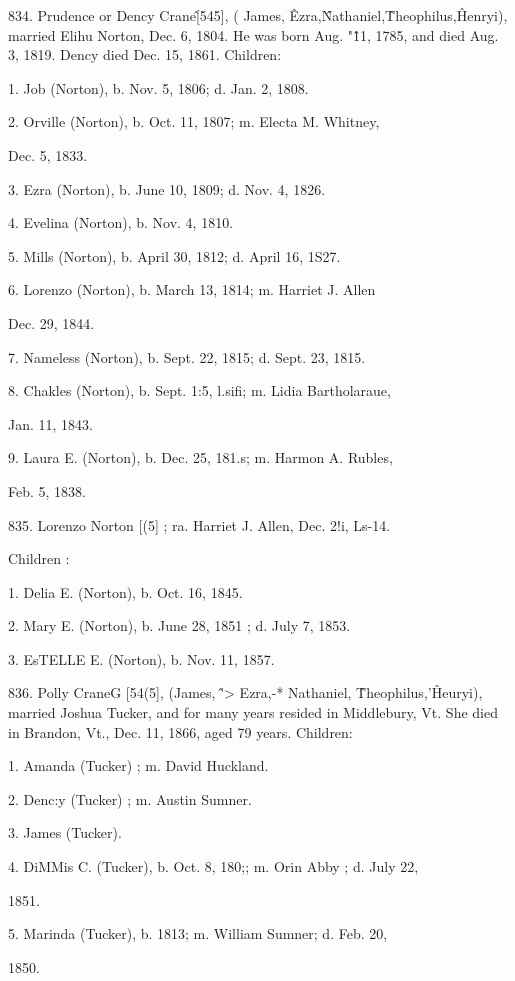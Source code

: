 834. Prudence or Dency Crane\^ [545], ( James, \^ Ezra,\^ 
Nathaniel,\^ Theophilus,\^ Henryi), married Elihu Norton, Dec. 
6, 1804. He was born Aug. "\^11, 1785, and died Aug. 3, 1819. 
Dency died Dec. 15, 1861. Children: 

1. Job (Norton), b. Nov. 5, 1806; d. Jan. 2, 1808. 

2. Orville (Norton), b. Oct. 11, 1807; m. Electa M. Whitney, 

Dec. 5, 1833. 

3. Ezra (Norton), b. June 10, 1809; d. Nov. 4, 1826. 

4. Evelina (Norton), b. Nov. 4, 1810. 

5. Mills (Norton), b. April 30, 1812; d. April 16, 1S27. 

6. Lorenzo (Norton), b. March 13, 1814; m. Harriet J. Allen 

Dec. 29, 1844. 

7. Nameless (Norton), b. Sept. 22, 1815; d. Sept. 23, 1815. 




8. Chakles (Norton), b. Sept. 1:5, l.sifi; m. Lidia Bartholaraue, 

Jan. 11, 1843. 

9. Laura E. (Norton), b. Dec. 25, 181.s; m. Harmon A. Rubles, 

Feb. 5, 1838. 

835. Lorenzo Norton [(5] ; ra. Harriet J. Allen, Dec. 2!i, Ls-14. 

Children : 

1. Delia E. (Norton), b. Oct. 16, 1845. 

2. Mary E. (Norton), b. June 28, 1851 ; d. July 7, 1853. 

3. EsTELLE E. (Norton), b. Nov. 11, 1857. 

836. Polly CraneG [54(5], (James, \^'> Ezra,-* Nathaniel, \^ 
Theophilus,'\^ Heuryi), married Joshua Tucker, and for many 
years resided in Middlebury, Vt. She died in Brandon, Vt., 
Dec. 11, 1866, aged 79 years. Children: 

1. Amanda (Tucker) ; m. David Huckland. 

2. Denc:y (Tucker) ; m. Austin Sumner. 

3. James (Tucker). 

4. DiMMis C. (Tucker), b. Oct. 8, 180;; m. Orin Abby ; d. July 22, 

1851. 

5. Marinda (Tucker), b. 1813; m. William Sumner; d. Feb. 20, 

1850. 

